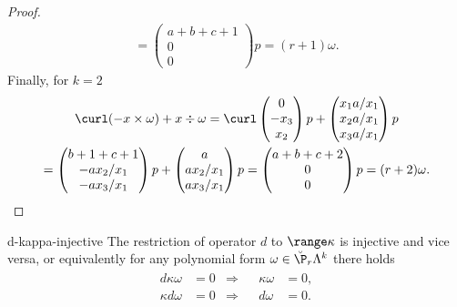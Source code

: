 \begin{proof}
\begin{multline}
    =
    \begin{pmatrix}
      a+b+c+1 \\0\\0
    \end{pmatrix}p
    = (r+1)\omega.
  \end{multline}
  Finally, for $k=2$
  \begin{multline}
    \curl(-x\times \omega) + x \div \omega
    = \curl
    \begin{pmatrix}
      0 \\ -x_3 \\ x_2
    \end{pmatrix}p
    +
    \begin{pmatrix}
      x_1 a/x_1\\x_2 a/x_1\\x_3 a/x_1\\
    \end{pmatrix}p
    \\=
    \begin{pmatrix}
      b+1+c+1\\-ax_2/x_1 \\ -a x_3/x_1
    \end{pmatrix}p
    +
    \begin{pmatrix}
      a\\ax_2/x_1\\ax_3/x_1
    \end{pmatrix}p
    =
    \begin{pmatrix}
      a+b+c+2\\0\\0
    \end{pmatrix}p
    = (r+2)\omega.
  \end{multline}
\end{proof}

\begin{Lemma}{d-kappa-injective}
  The restriction of operator $d$ to $\range \kappa$ is injective and
  vice versa, or equivalently for any polynomial form
  $\omega\in \breve \P_r\Lambda^k$ there holds
  \begin{gather}
    \label{eq:derham:16}
    \begin{aligned}
      d\kappa\omega &= 0 &\Longrightarrow&& \kappa\omega &= 0,\\
      \kappa d\omega &= 0 &\Longrightarrow&& d\omega &= 0.
    \end{aligned}
  \end{gather}
\end{Lemma}

